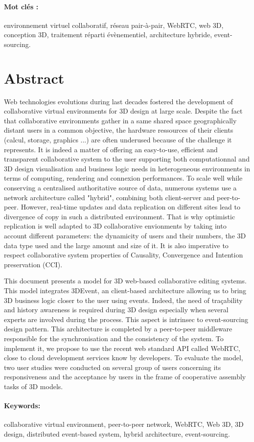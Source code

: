 \paragraph{Mot clés : }environnement virtuel collaboratif, réseau pair-à-pair, WebRTC, web 3D, conception 3D, traitement réparti évènementiel, architecture hybride, event-sourcing.
\pagebreak
\section*{Abstract}

Web technologies evolutions during last decades fostered the development of 
collaborative virtual environments for 3D design at large scale. Despite the fact 
that collaborative environments gather in a same shared space geographically 
distant users in a common objective, the hardware ressources of their clients (calcul, 
storage, graphics ...) are often underused because of the challenge it represents. It is indeed 
a matter of offering an easy-to-use, efficient and transparent collaborative system 
to the user supporting both computationnal and 3D design visualisation and 
business logic needs in heterogeneous environments in terms of computing, 
rendering and connexion performances. To scale well while conserving a 
centralised authoritative source of data, numerous systems use a network 
architecture called "hybrid", combining both client-server and peer-to-peer. 
However, real-time updates and data replication on different sites lead to 
divergence of copy in such a distributed environment. That is why optimistic 
replication is well adapted to 3D collaborative envionments by taking into account 
different parameters: the dynamicity of users and their numbers, the 3D data type 
used and the large amount and size of it. It is also imperative to respect 
collaborative system properties of Causality, Convergence and Intention 
preservation (CCI).

This document presents a model for 3D web-based collaborative editing systems. This model integrates 3DEvent, an client-based architecture allowing us to bring 3D business logic closer to the user using events. Indeed, the need of traçability and history awareness is required during 3D design especially when several experts are involved during the process. This aspect is intrinsec to event-sourcing design pattern. This architecture is completed by a peer-to-peer middleware responsible for the synchronisation and the consistency of the system. To implement it, we propose to use the recent web standard API called WebRTC, close to cloud development services know by developers. To evaluate the model, two user studies were conducted on several group of users concerning its responsiveness and the acceptance by users in the frame of cooperative assembly tasks of 3D models.




\paragraph{Keywords: }collaborative virtual environment, peer-to-peer network, WebRTC, Web 3D, 3D design, distributed event-based system, hybrid architecture, event-sourcing.

\pagebreak
